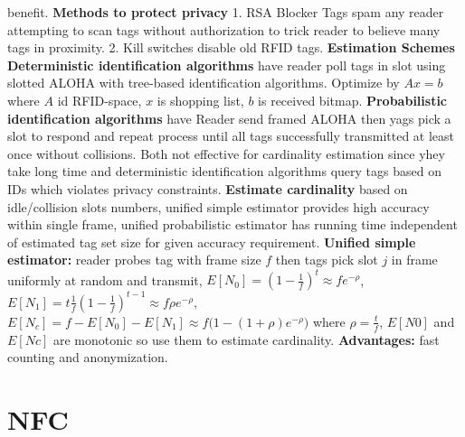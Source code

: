 \documentclass[9pt]{extarticle}
\begin{document}
\begin{multicols}{2}
benefit. \textbf{Methods to protect privacy} 1. RSA Blocker Tags spam any reader attempting to scan tags without authorization to trick reader to believe many tags in proximity. 2. Kill switches disable old RFID tags. \textbf{Estimation Schemes} \textbf{Deterministic identification algorithms }have reader poll tags in slot using slotted ALOHA with tree-based identification algorithms. Optimize by $Ax=b$ where $A$ id RFID-space, $x$ is shopping list, $b$ is received bitmap.\textbf{ Probabilistic identification algorithms} have Reader send framed ALOHA then yags pick a slot to respond and repeat process until all tags successfully transmitted at least once without collisions. Both not effective for cardinality estimation since yhey take long time and deterministic identification algorithms query tags based on IDs which violates privacy constraints. \textbf{Estimate cardinality} based on idle/collision slots numbers, unified simple estimator provides high accuracy within single frame, unified probabilistic estimator has running time independent of estimated tag set size for given accuracy requirement. \textbf{Unified simple estimator:} reader probes tag with frame size $f$ then tags pick slot $j$ in frame uniformly at random and transmit, $E[N_0]=(1-\frac{1}{f})^t\approx{fe^{-\rho}}$, $E[N_1]=t\frac{1}{f}(1-\frac{1}{f})^{t-1}\approx{f\rho{e}^{-\rho}}$, $E[N_c]=f-E[N_0]-E[N_1]\approx{f(1-(1+\rho)e^{-\rho}})$ where $\rho=\frac{t}{f}$, $E[N0]$ and $E[Nc]$ are monotonic so use them to estimate cardinality. \textbf{Advantages:} fast counting and anonymization. 

\section{NFC}


\end{multicols}
\end{document}
